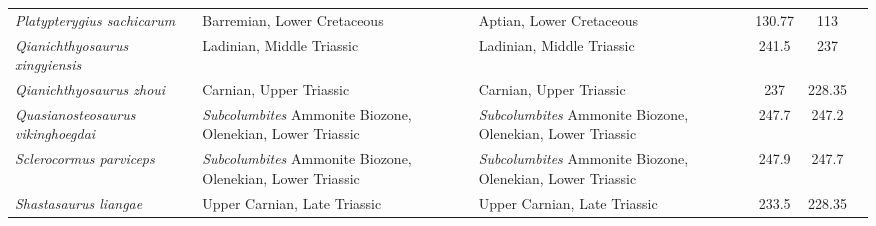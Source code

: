 \begin{longtabu}{>{\itshape}lXXSSl}
	Platypterygius sachicarum                            & Barremian, Lower Cretaceous                                                                                                        & Aptian, Lower Cretaceous                                                                                                           & 130.77                   & 113                      & \cite{Paramo1997} \\                     
	Qianichthyosaurus xingyiensis                        & Ladinian, Middle Triassic                                                                                                          & Ladinian, Middle Triassic                                                                                                          & 241.5                    & 237                      & \cite{Yang2013} \\                       
	Qianichthyosaurus zhoui                              & Carnian, Upper Triassic                                                                                                            & Carnian, Upper Triassic                                                                                                            & 237                      & 228.35                   & \cite{Li1999} \\                         
	Quasianosteosaurus vikinghoegdai                     & \emph{Subcolumbites} Ammonite Biozone, Olenekian, Lower Triassic                                                                   & \emph{Subcolumbites} Ammonite Biozone, Olenekian, Lower Triassic                                                                   & 247.7                    & 247.2                    & \cite{Maisch2003c} \\                    
	Sclerocormus parviceps                               & \emph{Subcolumbites} Ammonite Biozone, Olenekian, Lower Triassic                                                                   & \emph{Subcolumbites} Ammonite Biozone, Olenekian, Lower Triassic                                                                   & 247.9                    & 247.7                    & \cite{Jiang2016,Motani2017} \\           
	Shastasaurus liangae                                 & Upper Carnian, Late Triassic                                                                                                       & Upper Carnian, Late Triassic                                                                                                       & 233.5                    & 228.35                   & \cite{Yin2000} \\                        

\end{longtabu}
